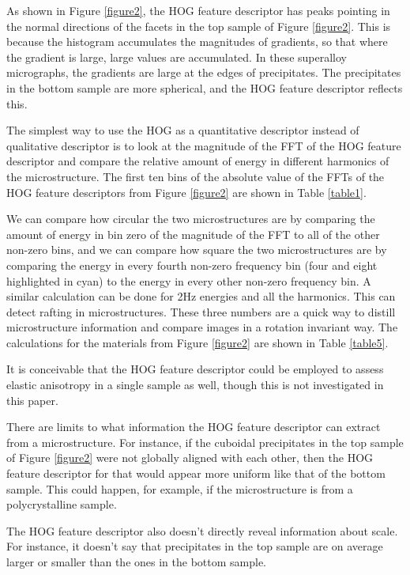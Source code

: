 \documentclass[review]{elsarticle}
\begin{document}
	As shown in Figure \ref{figure2}, the HOG feature descriptor has peaks pointing in the normal directions of the facets in the top sample of Figure \ref{figure2}. This is because the histogram accumulates the magnitudes of gradients, so that where the gradient is large, large values are accumulated. In these superalloy micrographs, the gradients are large at the edges of precipitates. The precipitates in the bottom sample are more spherical, and the HOG feature descriptor reflects this.

	The simplest way to use the HOG as a quantitative descriptor instead of qualitative descriptor is to look at the magnitude of the FFT of the HOG feature descriptor and compare the relative amount of energy in different harmonics of the microstructure. The first ten bins of the absolute value of the FFTs of the HOG feature descriptors from Figure \ref{figure2} are shown in Table \ref{table1}.
	
  	We can compare how circular the two microstructures are by comparing the amount of energy in bin zero of the magnitude of the FFT to all of the other non-zero bins, and we can compare how square the two microstructures are by comparing the energy in every fourth non-zero frequency bin (four and eight highlighted in cyan) to the energy in every other non-zero frequency bin. A similar calculation can be done for 2Hz energies and all the harmonics. This can detect rafting in microstructures. These three numbers are a quick way to distill microstructure information and compare images in a rotation invariant way. The calculations for the materials from Figure \ref{figure2} are shown in Table \ref{table5}.
  	
	It is conceivable that the HOG feature descriptor could be employed to assess elastic anisotropy in a single sample as well, though this is not investigated in this paper.
	
	There are limits to what information the HOG feature descriptor can extract from a microstructure. For instance, if the cuboidal precipitates in the top sample of Figure \ref{figure2} were not globally aligned with each other, then the HOG feature descriptor for that would appear more uniform like that of the bottom sample. This could happen, for example, if the microstructure is from a polycrystalline sample.
	
	The HOG feature descriptor also doesn't directly reveal information about scale. For instance, it doesn't say that precipitates in the top sample are on average larger or smaller than the ones in the bottom sample.
	
\end{document}

